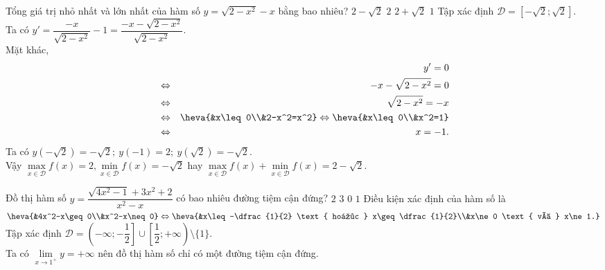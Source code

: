 \begin{ex}%
	Tổng giá trị nhỏ nhất và lớn nhất của hàm số $y=\sqrt{2-x^2}-x$ bằng bao nhiêu?
	\choice
	{\True $2-\sqrt{2}$}
	{$2$}
	{$2+\sqrt{2}$}
	{$1$}
	\loigiai
	{
		Tập xác định $\mathscr{D}=[-\sqrt{2};\sqrt{2}]$.\\
		Ta có $y'=\dfrac{-x}{\sqrt{2-x^2}}-1=\dfrac{-x-\sqrt{2-x^2}}{\sqrt{2-x^2}}$.\\
		Mặt khác,
		\begin{eqnarray*}
			& & y'=0\\
			& \Leftrightarrow & -x-\sqrt{2-x^2}=0\\
			& \Leftrightarrow & \sqrt{2-x^2}=-x\\
			& \Leftrightarrow & \heva{&x\leq 0\\&2-x^2=x^2} \Leftrightarrow \heva{&x\leq 0\\&x^2=1}\\
			& \Leftrightarrow & x=-1.
		\end{eqnarray*}	
	Ta có $y\left(-\sqrt{2}\right)=-\sqrt{2};~y(-1)=2;~y\left(\sqrt{2}\right)=-\sqrt{2}$.\\
	Vậy $\max\limits_{x\in\mathscr D} f(x)=2,\min\limits_{x\in\mathscr D} f(x)=-\sqrt{2}$ hay $\max\limits_{x\in\mathscr D} f(x)+\min\limits_{x\in\mathscr D} f(x)=2-\sqrt{2}$.
	}
\end{ex}

\begin{ex}%
	 Đồ thị hàm số $y=\dfrac{\sqrt{4x^2-1}+3x^2+2}{x^2-x}$ có bao nhiêu đường tiệm cận đứng?
	\choice
	{$2$}
	{$3$}
	{$0$}
	{\True $1$}
	\loigiai
	{
		Điều kiện xác định của hàm số là $\heva{&4x^2-x\geq0\\&x^2-x\neq0} \Leftrightarrow \heva{&x\leq-\dfrac{1}{2} \text{ hoặc } x\geq \dfrac{1}{2}\\&x\ne0 \text{ và } x\ne 1.}$\\
		Tập xác định $\mathscr{D}=\left(-\infty;-\dfrac{1}{2}\right] \cup \left[\dfrac{1}{2};+\infty\right)\setminus \{1\}$.\\
		Ta có $\lim\limits_{x\to 1^+}y=+\infty$ nên đồ thị hàm số chỉ có một đường tiệm cận đứng.
	}
\end{ex}

